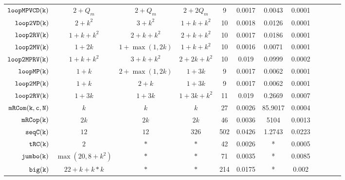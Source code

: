 {\begin {table}[H]
\begin{center}
{\begin{tabular}{| >{\tiny}r | c | c | c | c | c | c | c | c | c | c | c }
         $ {\mathtt{loopMPVCD(k)}}$ & $2+Q_m$ &  $2 + Q_m$  & $2+2Q_m$   &   9 & 0.0017 & 0.0043  & 0.0001 \\
         $  \mathtt{loop2VD(k)}$ & $2 + k^2$ &   $3 + k^2$ & $1 + k + k^2 $   &  10 & 0.0018 & 0.0126  & 0.0001  \\
         $  \mathtt{loop2RV(k)}$ & $1 + k +  k^2$ &  
         $ 2 + k +  k^2 $ 
         &  $2 + k + k^2$   &  10 & 0.0017 & 0.0186  & 0.0001  \\
         $  \mathtt{loop2MV(k)}$ & $1 + 2k $ & $1 + \max(1,2k) $ &  $1 + k + k^2 $  & 10 & 0.0016 & 0.0071  & 0.0001 \\
         $ \mathtt{loop2MPRV(k)}$ & $1 + k + k^2$ &  $3 + k + k^2  $ &  $2 + 2k + k^2  $  &  10 & 0.019 & 0.0999  & 0.0002 \\
         {$ \mathtt{loopMP(k)}$} & $1 + k$ &  $ 2 + \max(1,2k) $ & $1 + 3k  $  &  9 & 0.0017 & 0.0062  & 0.0001  \\
         {$ \mathtt{loop2MP(k)}$} & $1 + k$ &  $ 2 + k $ & $1 + 3k  $  &  9 & 0.0017 & 0.0062  & 0.0001  \\
         { $\mathtt{loop2RV(k)}$} & $1 + 3k$ &  $1 + 3k $ &  $1 + 3k  + k^2$  &  11 & 0.019 & 0.2669  & 0.0007 \\
         $  \mathtt{mRCom(k,c,N)}$ & $k$ & $ k   $ & $k $   &  27 & 0.0026 & 85.9017  & 0.0004 \\
         $  \mathtt{mRCop(k)}$ & $2k$ & $  2k $ & $ 2k $   &  46 & 0.0036 & 5104  &  0.0013\\
         $  \mathtt{seqC(k)}$ & $12$ & $12  $  & $326 $  &  502 & 0.0426  & 1.2743  & 0.0223 \\
         $  \mathtt{tRC(k)}$ & $2$ &  $ * $ & $*  $  &  42 & 0.0026 & *  & 0.0005\\
         $  \mathtt{{jumbo(k)}}$ & $ \max(20, 8+k^2)$ &  $ * $   &   $* $  &  71 & 0.0035 & * &  0.0085 \\
         $  {\mathtt{big(k)}} $ & $22+k+k*k$ &  $* $ &  $* $  &  214 & 0.0175 & *  & 0.002 \\
         \hline \hline
        \end{tabular}
}
\end{center}
\end{table}
}


